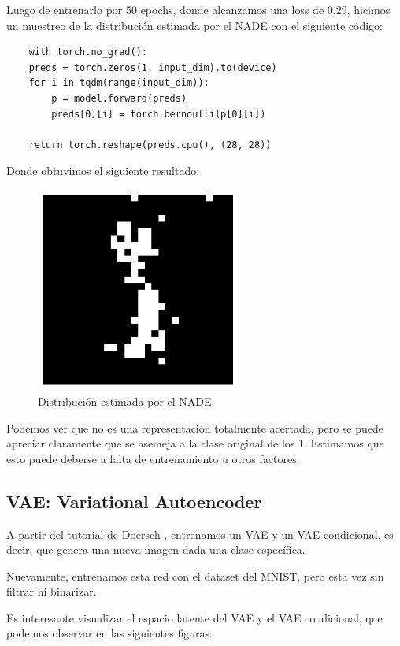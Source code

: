 \documentclass[11pt]{article}
\begin{document}
Luego de entrenarlo por 50 epochs, donde alcanzamos una loss de $0.29$, hicimos un muestreo de la distribución estimada por el NADE con el siguiente código:
\begin{verbatim}
    with torch.no_grad():
    preds = torch.zeros(1, input_dim).to(device)
    for i in tqdm(range(input_dim)):
        p = model.forward(preds)
        preds[0][i] = torch.bernoulli(p[0][i])

    return torch.reshape(preds.cpu(), (28, 28))
\end{verbatim}
Donde obtuvimos el siguiente resultado:

\begin{figure}[h]
    \centering
    \includegraphics[width=0.6\textwidth]{NADE/nade_generation.png}
    \caption{Distribución estimada por el NADE}
    \label{fig:nade_gen}
\end{figure}

Podemos ver que no es una representación totalmente acertada, pero se puede apreciar claramente que se asemeja a la clase original de los 1. Estimamos que esto puede deberse a falta de entrenamiento u otros factores.
\newpage
\subsection{VAE: Variational Autoencoder}

A partir del tutorial de Doersch \cite{vae}, entrenamos un VAE y un VAE condicional, es decir, que genera una nueva imagen dada una clase específica.

Nuevamente, entrenamos esta red con el dataset del MNIST, pero esta vez sin filtrar ni binarizar.

Es interesante visualizar el espacio latente del VAE y el VAE condicional, que podemos observar en las siguientes figuras:
\end{document}
